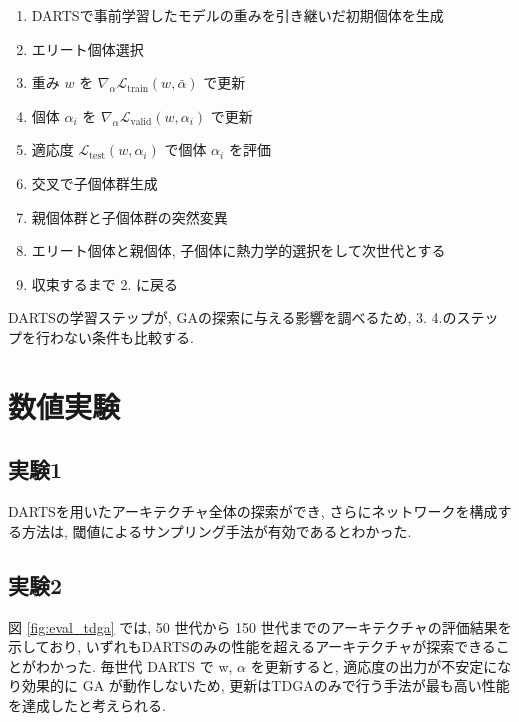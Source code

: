 \documentclass[a4paper,twoside,twocolumn,10pt]{article}
\begin{document}
\begin{enumerate}
  \item DARTSで事前学習したモデルの重みを引き継いだ初期個体を生成
  \item エリート個体選択
  \item 重み $w$ を $\displaystyle \nabla_\alpha \mathcal{L}_{\mathrm{train}}(w, \bar{\alpha})$ で更新
  \item 個体 $\alpha_i$ を $\displaystyle \nabla_\alpha \mathcal{L}_{\mathrm{valid}}(w, \alpha_i)$ で更新
  \item 適応度 $\displaystyle \mathcal{L}_{\mathrm{test}}(w, \alpha_i)$ で個体 $\alpha_i$ を評価
  \item 交叉で子個体群生成
  \item 親個体群と子個体群の突然変異
  \item エリート個体と親個体, 子個体に熱力学的選択をして次世代とする
  \item 収束するまで 2. に戻る
\end{enumerate}

DARTSの学習ステップが, GAの探索に与える影響を調べるため,
3. 4.のステップを行わない条件も比較する.


\section{数値実験}
\subsection{実験1}
DARTSを用いたアーキテクチャ全体の探索ができ,
さらにネットワークを構成する方法は, 閾値によるサンプリング手法が有効であるとわかった.

\subsection{実験2}
図 \ref{fig:eval_tdga} では, 50 世代から 150 世代までのアーキテクチャの評価結果を示しており,
いずれもDARTSのみの性能を超えるアーキテクチャが探索できることがわかった.
毎世代 DARTS で w, $\alpha$ を更新すると, 適応度の出力が不安定になり効果的に GA が動作しないため,
更新はTDGAのみで行う手法が最も高い性能を達成したと考えられる.
\end{document}
